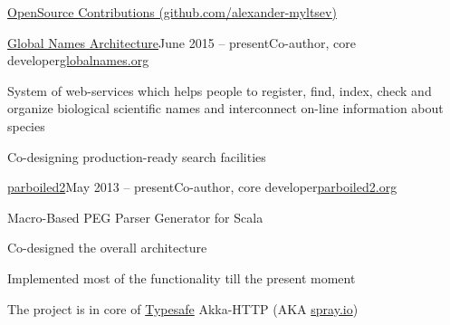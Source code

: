 \documentclass{resume} %
\begin{document}

\begin{rSection}{\href{https://github.com/alexander-myltsev?tab=repositories}{OpenSource 
Contributions (github.com/alexander-myltsev)}}

\begin{samepage}
\begin{rSubsection}{\href{https://github.com/GlobalNamesArchitecture/}{Global
Names Architecture}}{June 2015 -- present}{Co-author, core
developer}{\href{http://globalnames.org/}{globalnames.org}}
\item System of web-services which helps people to register, find, index, check and organize biological scientific names and interconnect on-line information about species
\item Co-designing production-ready search facilities
\end{rSubsection}
\end{samepage}

\pagebreak

\begin{samepage}
\begin{rSubsection}{\href{http://parboiled2.org}{parboiled2}}{May 2013 -- present}{Co-author, core developer}{\href{http://parboiled2.org}{parboiled2.org}}
\item Macro-Based PEG Parser Generator for Scala
\item Co-designed the overall architecture
\item Implemented most of the functionality till the present moment
\item The project is in core of \href{http://typesafe.com}{Typesafe} Akka-HTTP (AKA \href{http://spray.io}{spray.io})
\end{rSubsection}
\end{samepage}

\begin{comment}
\begin{samepage}
\begin{rSubsection}{\href{http://russianaicup.ru/}{RussianAI Cup}}{September 2014 -- October 2014}{Core contributor to Scala package}{\href{http://github.com/iSerge/scala-cgdk}{github.com/iSerge/scala-cgdk}}
\item public post about package: \href{http://russianaicup.ru/post/20}{http://russianaicup.ru/post/20}
\end{rSubsection}
\end{samepage}


\end{comment}
\end{rSection}
\end{document}
